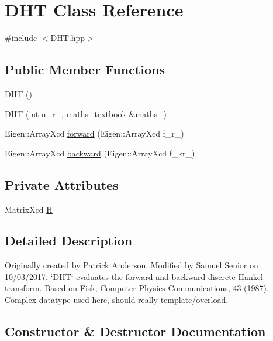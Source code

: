 \hypertarget{class_d_h_t}{}\section{D\+HT Class Reference}
\label{class_d_h_t}


{\ttfamily \#include $<$D\+H\+T.\+hpp$>$}

\subsection*{Public Member Functions}
\begin{DoxyCompactItemize}
\item 
\hyperlink{class_d_h_t_addc81efbe31ac923b054636f675a2d8b}{D\+HT} ()
\item 
\hyperlink{class_d_h_t_a9f6e442f2bc6f1e2f5d2dd2a3f9a557d}{D\+HT} (int n\+\_\+r\+\_\+, \hyperlink{classmaths__textbook}{maths\+\_\+textbook} \&maths\+\_\+)
\item 
Eigen\+::\+Array\+Xcd \hyperlink{class_d_h_t_a916089f65c6ad05eace5e1f9854f50f4}{forward} (Eigen\+::\+Array\+Xcd f\+\_\+r\+\_\+)
\item 
Eigen\+::\+Array\+Xcd \hyperlink{class_d_h_t_a923f3d375e55f2dbdab2763de372f440}{backward} (Eigen\+::\+Array\+Xcd f\+\_\+kr\+\_\+)
\end{DoxyCompactItemize}
\subsection*{Private Attributes}
\begin{DoxyCompactItemize}
\item 
Matrix\+Xcd \hyperlink{class_d_h_t_ac17a580b606f25c937dbdc81dba517d7}{H}
\end{DoxyCompactItemize}


\subsection{Detailed Description}
Originally created by Patrick Anderson. Modified by Samuel Senior on 10/03/2017. \char`\"{}\+D\+H\+T\char`\"{} evaluates the forward and backward discrete Hankel transform. Based on Fisk, Computer Physics Communications, 43 (1987). Complex datatype used here, should really template/overload. 

\subsection{Constructor \& Destructor Documentation}
\mbox{\label{class_d_h_t_addc81efbe31ac923b054636f675a2d8b}} 
